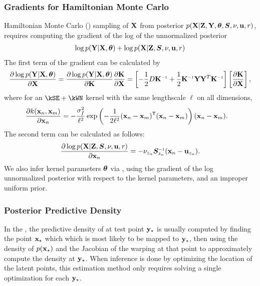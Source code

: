 \subsubsection{Gradients for Hamiltonian Monte Carlo}

Hamiltonian Monte Carlo (\HMC{}) sampling of $\mathbf{X}$ from posterior ${p(\mathbf{X}|\mathbf{Z},\mathbf{Y},\bm{\theta},\bm{S},\nu,{\bf{u}},r)}$, requires computing the gradient of the log of the unnormalized posterior
%
\begin{align}
\log p(\mathbf{Y}|\mathbf{X},\bm{\theta}) + \log p(\mathbf{X}|\mathbf{Z},\bm{S},\nu,{\bf{u}},r)
\label{eq:warped-hmc1}
\end{align}
%
The first term of the gradient can be calculated by
%
\begin{align}
\pderiv{\log p(\vY | \vX,\bm{\theta})}{\vX} =  \pderiv{\log p(\vY | \vX,\bm{\theta})}{\vK} \pderiv{\vK}{\vX} = \left[ -\frac{1}{2}D\vK\inv+\frac{1}{2}\vK\inv \vY \vY^{T} \vK\inv \right]\left[\pderiv{\vK}{\vX}\right],
\label{eq:warped-hmc2}
\end{align}
%
where for an $\kSE + \kWN$ kernel with the same lengthscale $\ell$ on all dimensions,
%
\begin{align}
\frac{\partial k({\bf{x}}_{n},{\bf{x}}_{m})}{\partial {\bf{x}}_n}
 & = -\frac{\sigma^2_f}{\ell^2} \exp \left( - \frac{1}{2 \ell^2} ({\bf{x}}_n - {\bf{x}}_m)^{\mathsf{T}} ({\bf{x}}_n - {\bf{x}}_m) \right) ({\bf{x}}_n - {\bf{x}}_m).
 \label{eq:warped-hmc3}
\end{align}
%
The second term can be calculated as follows:
\begin{align}
\frac{\partial \log p(\vX|\vZ,\bm{S},\nu,\vu,r)}{\partial \vx_{n}} 
= -\nu_{z_{n}}\bm{S}_{z_{n}}\inv(\vx_{n}-\vu_{z_{n}}).
\label{eq:warped-hmc4}
\end{align}
We also infer kernel parameters ${\boldsymbol{\theta}}$ via \HMC{}, using the gradient of the log unnormalized posterior with respect to the kernel parameters, and an improper uniform prior.




\subsubsection{Posterior Predictive Density}
\label{sec:iwmm-predictive-density}

In the \gplvm{}, the predictive density of at test point ${\bf{y}}_\star$ is usually computed by finding the point ${\bf{x}}_\star$ which which is most likely to be mapped to ${\bf{y}}_\star$, then using the density of $p({\bf{x}}_\star)$ and the Jacobian of the warping at that point to approximately compute the density at ${\bf{y}}_\star$.
When inference is done by optimizing the location of the latent points, this estimation method only requires solving a single optimization for each ${\bf{y}}_\star$.  

